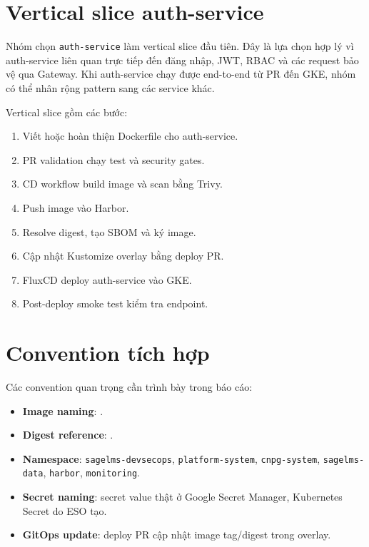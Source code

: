 \section{Vertical slice auth-service}

Nhóm chọn \texttt{auth-service} làm vertical slice đầu tiên. Đây là lựa chọn hợp lý vì auth-service liên quan trực tiếp đến đăng nhập, JWT, RBAC và các request bảo vệ qua Gateway. Khi auth-service chạy được end-to-end từ PR đến GKE, nhóm có thể nhân rộng pattern sang các service khác.

Vertical slice gồm các bước:

\begin{enumerate}
  \item Viết hoặc hoàn thiện Dockerfile cho auth-service.
  \item PR validation chạy test và security gates.
  \item CD workflow build image và scan bằng Trivy.
  \item Push image vào Harbor.
  \item Resolve digest, tạo SBOM và ký image.
  \item Cập nhật Kustomize overlay bằng deploy PR.
  \item FluxCD deploy auth-service vào GKE.
  \item Post-deploy smoke test kiểm tra endpoint.
\end{enumerate}

\section{Convention tích hợp}

Các convention quan trọng cần trình bày trong báo cáo:

\begin{itemize}
  \item \textbf{Image naming}: .
  \item \textbf{Digest reference}: .
  \item \textbf{Namespace}: \texttt{sagelms-devsecops}, \texttt{platform-system}, \texttt{cnpg-system}, \texttt{sagelms-data}, \texttt{harbor}, \texttt{monitoring}.
  \item \textbf{Secret naming}: secret value thật ở Google Secret Manager, Kubernetes Secret do ESO tạo.
  \item \textbf{GitOps update}: deploy PR cập nhật image tag/digest trong overlay.
\end{itemize}

